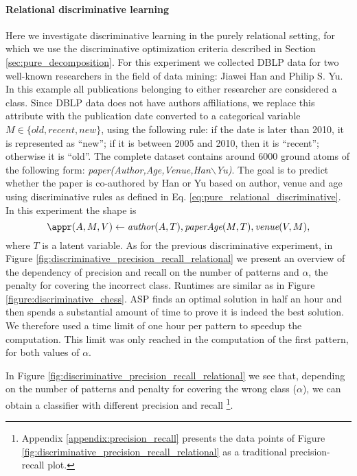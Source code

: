 \paragraph{Relational discriminative learning}
Here we investigate discriminative learning in the purely relational setting, for which we use the discriminative optimization criteria described in Section \ref{sec:pure_decomposition}. For this experiment we collected DBLP data for two well-known researchers in the field of data mining: Jiawei Han and Philip S. Yu. In this example all publications belonging to either researcher are considered a class. Since DBLP data does not have authors affiliations, we replace this attribute with the publication date converted to a categorical variable $M \in \{ \textit{old}, \textit{recent}, \textit{new} \}$, using the following rule: if the date is later than 2010, it is represented as ``new''; if it is between 2005 and 2010, then it is ``recent''; otherwise it is ``old''. The complete dataset contains around 6000 ground atoms of the following form: \textit{paper(Author,Age,Venue,Han$\backslash$Yu)}. The goal is to predict whether the paper is co-authored by Han or Yu based on author, venue and age using discriminative rules as defined in Eq. \ref{eq:pure_relational_discriminative}. In this experiment the shape is
\begin{equation*}
  \appr(A,M,V) \leftarrow \textit{author}(A,T), \textit{paperAge}(M,T), \textit{venue}(V,M),
\end{equation*}
where $T$ is a latent variable. As for the previous discriminative experiment, in Figure \ref{fig:discriminative_precision_recall_relational} we present an overview of the dependency of precision and recall on the number of patterns and $\alpha$, the penalty for covering the incorrect class. Runtimes are similar as in Figure \ref{figure:discriminative_chess}. ASP finds an optimal solution in half an hour and then spends a substantial amount of time to prove it is indeed the best solution. We therefore used a time limit of one hour per pattern to speedup the computation. This limit was only reached in the computation of the first pattern, for both values of $\alpha$.

In Figure \ref{fig:discriminative_precision_recall_relational} we see that, depending on the number of patterns and penalty for covering the wrong class ($\alpha$), we can obtain a classifier with different precision and recall%
\footnote{\changesb Appendix \ref{appendix:precision_recall} presents the data points of Figure \ref{fig:discriminative_precision_recall_relational} as a traditional precision-recall plot.\changese}.


